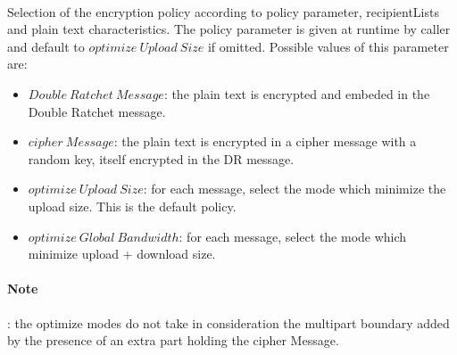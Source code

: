 \documentclass[a4paper,11pt]{article}
\begin{document}
      \paragraph*{}Selection of the encryption policy according to policy parameter, recipientLists and plain text characteristics. The policy parameter is given at runtime by caller and default to $optimize\ Upload\ Size$ if omitted. Possible values of this parameter are:
        \begin{itemize}
          \item $Double\ Ratchet\ Message$: the plain text is encrypted and embeded in the Double Ratchet message.
          \item $cipher\ Message$: the plain text is encrypted in a cipher message with a random key, itself encrypted in the DR message.
          \item $optimize\ Upload\ Size$: for each message, select the mode which minimize the upload size. This is the default policy.
          \item $optimize\ Global\ Bandwidth$: for each message, select the mode which minimize upload + download size.
        \end{itemize}
        \paragraph*{Note}: the optimize modes do not take in consideration the multipart boundary added by the presence of an extra part holding the cipher Message.
        \label{messageEncrypt}
        
\end{document}

